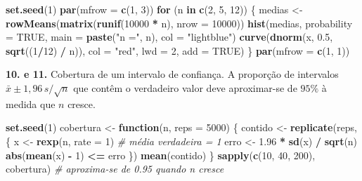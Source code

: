 \documentclass[
  portuguese,
  11pt,
  openany]{book}
\newenvironment{Shaded}{\begin{snugshade}}{\end{snugshade}}
\newcommand{\AttributeTok}[1]{\textcolor[rgb]{0.13,0.29,0.53}{#1}}
\newcommand{\CommentTok}[1]{\textcolor[rgb]{0.56,0.35,0.01}{\textit{#1}}}
\newcommand{\ConstantTok}[1]{\textcolor[rgb]{0.56,0.35,0.01}{#1}}
\newcommand{\ControlFlowTok}[1]{\textcolor[rgb]{0.13,0.29,0.53}{\textbf{#1}}}
\newcommand{\DecValTok}[1]{\textcolor[rgb]{0.00,0.00,0.81}{#1}}
\newcommand{\FloatTok}[1]{\textcolor[rgb]{0.00,0.00,0.81}{#1}}
\newcommand{\FunctionTok}[1]{\textcolor[rgb]{0.13,0.29,0.53}{\textbf{#1}}}
\newcommand{\NormalTok}[1]{#1}
\newcommand{\OtherTok}[1]{\textcolor[rgb]{0.56,0.35,0.01}{#1}}
\newcommand{\SpecialCharTok}[1]{\textcolor[rgb]{0.81,0.36,0.00}{\textbf{#1}}}
\newcommand{\StringTok}[1]{\textcolor[rgb]{0.31,0.60,0.02}{#1}}
\begin{document}
\begin{Shaded}
\begin{Highlighting}[]
\FunctionTok{set.seed}\NormalTok{(}\DecValTok{1}\NormalTok{)}
\FunctionTok{par}\NormalTok{(}\AttributeTok{mfrow =} \FunctionTok{c}\NormalTok{(}\DecValTok{1}\NormalTok{, }\DecValTok{3}\NormalTok{))}
\ControlFlowTok{for}\NormalTok{ (n }\ControlFlowTok{in} \FunctionTok{c}\NormalTok{(}\DecValTok{2}\NormalTok{, }\DecValTok{5}\NormalTok{, }\DecValTok{12}\NormalTok{)) \{}
\NormalTok{  medias }\OtherTok{\textless{}{-}} \FunctionTok{rowMeans}\NormalTok{(}\FunctionTok{matrix}\NormalTok{(}\FunctionTok{runif}\NormalTok{(}\DecValTok{10000} \SpecialCharTok{*}\NormalTok{ n), }\AttributeTok{nrow =} \DecValTok{10000}\NormalTok{))}
  \FunctionTok{hist}\NormalTok{(medias, }\AttributeTok{probability =} \ConstantTok{TRUE}\NormalTok{, }\AttributeTok{main =} \FunctionTok{paste}\NormalTok{(}\StringTok{"n ="}\NormalTok{, n), }\AttributeTok{col =} \StringTok{"lightblue"}\NormalTok{)}
  \FunctionTok{curve}\NormalTok{(}\FunctionTok{dnorm}\NormalTok{(x, }\FloatTok{0.5}\NormalTok{, }\FunctionTok{sqrt}\NormalTok{((}\DecValTok{1}\SpecialCharTok{/}\DecValTok{12}\NormalTok{) }\SpecialCharTok{/}\NormalTok{ n)), }\AttributeTok{col =} \StringTok{"red"}\NormalTok{, }\AttributeTok{lwd =} \DecValTok{2}\NormalTok{, }\AttributeTok{add =} \ConstantTok{TRUE}\NormalTok{)}
\NormalTok{\}}
\FunctionTok{par}\NormalTok{(}\AttributeTok{mfrow =} \FunctionTok{c}\NormalTok{(}\DecValTok{1}\NormalTok{, }\DecValTok{1}\NormalTok{))}
\end{Highlighting}
\end{Shaded}

\textbf{10. e 11.} Cobertura de um intervalo de confiança. A proporção de intervalos
\(\bar{x} \pm 1{,}96\,s/\sqrt{n}\) que contêm o verdadeiro valor deve aproximar-se
de \(95\%\) à medida que \(n\) cresce.

\begin{Shaded}
\begin{Highlighting}[]
\FunctionTok{set.seed}\NormalTok{(}\DecValTok{1}\NormalTok{)}
\NormalTok{cobertura }\OtherTok{\textless{}{-}} \ControlFlowTok{function}\NormalTok{(n, }\AttributeTok{reps =} \DecValTok{5000}\NormalTok{) \{}
\NormalTok{  contido }\OtherTok{\textless{}{-}} \FunctionTok{replicate}\NormalTok{(reps, \{}
\NormalTok{    x }\OtherTok{\textless{}{-}} \FunctionTok{rexp}\NormalTok{(n, }\AttributeTok{rate =} \DecValTok{1}\NormalTok{)               }\CommentTok{\# média verdadeira = 1}
\NormalTok{    erro }\OtherTok{\textless{}{-}} \FloatTok{1.96} \SpecialCharTok{*} \FunctionTok{sd}\NormalTok{(x) }\SpecialCharTok{/} \FunctionTok{sqrt}\NormalTok{(n)}
    \FunctionTok{abs}\NormalTok{(}\FunctionTok{mean}\NormalTok{(x) }\SpecialCharTok{{-}} \DecValTok{1}\NormalTok{) }\SpecialCharTok{\textless{}=}\NormalTok{ erro}
\NormalTok{  \})}
  \FunctionTok{mean}\NormalTok{(contido)}
\NormalTok{\}}
\FunctionTok{sapply}\NormalTok{(}\FunctionTok{c}\NormalTok{(}\DecValTok{10}\NormalTok{, }\DecValTok{40}\NormalTok{, }\DecValTok{200}\NormalTok{), cobertura)        }\CommentTok{\# aproxima{-}se de 0.95 quando n cresce}
\end{Highlighting}
\end{Shaded}
\end{document}
